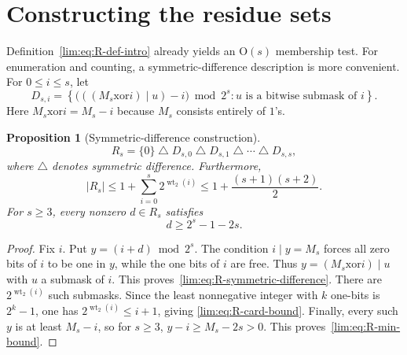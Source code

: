 \documentclass[11pt]{article}
\newtheorem{proposition}[theorem]{Proposition}
\theoremstyle{definition}
\theoremstyle{remark}
\newcommand{\wt}{\operatorname{wt}_2}
\newcommand{\bor}{\mathbin{\vert}}
\newcommand{\xor}{\mathbin{\triangle}}
\newcommand{\Oh}{\mathrm O}
\begin{document}
\section{Constructing the residue sets}

Definition~\eqref{lim:eq:R-def-intro} already yields an $\Oh(s)$ membership test.
For enumeration and counting, a symmetric-difference description is more
convenient.  For $0\le i\le s$, let
\begin{equation}\label{lim:eq:Dsi}
 D_{s,i}=\left\{
  \bigl(((M_s\mathbin{\mathrm{xor}}i)\bor u)-i\bigr)\bmod2^s:
  u\text{ is a bitwise submask of }i
 \right\}.
\end{equation}
Here $M_s\mathbin{\mathrm{xor}}i=M_s-i$ because $M_s$ consists entirely of
$1$'s.

\begin{proposition}[Symmetric-difference construction]
\label{lim:prop:R-symmetric-difference}
\begin{equation}\label{lim:eq:R-symmetric-difference}
  R_s=\{0\}\xor D_{s,0}\xor D_{s,1}\xor\cdots\xor D_{s,s},
\end{equation}
where $\xor$ denotes symmetric difference.
Furthermore,
\begin{equation}\label{lim:eq:R-card-bound}
  |R_s|\le1+\sum_{i=0}^{s}2^{\wt(i)}
  \le1+\frac{(s+1)(s+2)}2.
\end{equation}
For $s\ge3$, every nonzero $d\in R_s$ satisfies
\begin{equation}\label{lim:eq:R-min-bound}
  d\ge2^s-1-2s.
\end{equation}
\end{proposition}

\begin{proof}
Fix $i$.  Put $y=(i+d)\bmod2^s$.  The condition $i\bor y=M_s$ forces all
zero bits of $i$ to be one in $y$, while the one bits of $i$ are free.
Thus $y=(M_s\mathbin{\mathrm{xor}}i)\bor u$ with $u$ a submask of $i$.
This proves~\eqref{lim:eq:R-symmetric-difference}.
There are $2^{\wt(i)}$ such submasks.  Since the least nonnegative integer
with $k$ one-bits is $2^k-1$, one has $2^{\wt(i)}\le i+1$, giving
\eqref{lim:eq:R-card-bound}.
Finally, every such $y$ is at least $M_s-i$, so for $s\ge3$,
$y-i\ge M_s-2s>0$.  This proves~\eqref{lim:eq:R-min-bound}.
\end{proof}
\end{document}
